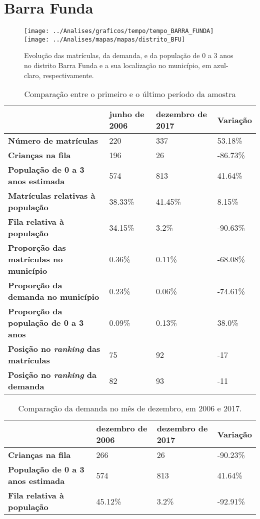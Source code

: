 \section{Barra Funda}
\begin{figure}[H]
\centering
\texttt{[image: ../Analises/graficos/tempo/tempo\_BARRA\_FUNDA]}
\texttt{[image: ../Analises/mapas/mapas/distrito\_BFU]}
\caption{Evolução das matrículas, da demanda, e da população de 0 a 3 anos no distrito Barra Funda e a sua localização no município, em azul-claro, respectivamente.}
\end{figure}
\begin{table}[H]
\begin{tabular}{l|l|l|l}
\textbf{}                                      & \textbf{junho de 2006}       & \textbf{dezembro de 2017}    & \textbf{Variação} \\ \hline
\textbf{Número de matrículas}                  & 220 & 337 & 53.18\% \\ \hline
\textbf{Crianças na fila}                      & 196 & 26 & -86.73\% \\ \hline
\textbf{População de 0 a 3 anos estimada}      & 574 & 813 & 41.64\% \\ \hline
\textbf{Matrículas relativas à população}      & 38.33\% & 41.45\% & 8.15\% \\ \hline
\textbf{Fila relativa à população}             & 34.15\% & 3.2\% & -90.63\% \\ \hline
\textbf{Proporção das matrículas no município} & 0.36\% & 0.11\% & -68.08\% \\ \hline
\textbf{Proporção da demanda no município}     & 0.23\% & 0.06\% & -74.61\% \\ \hline
\textbf{Proporção da população de 0 a 3 anos}  & 0.09\% & 0.13\% & 38.0\% \\ \hline
\textbf{Posição no \textit{ranking} das matrículas}     & 75 & 92 & -17 \\ \hline
\textbf{Posição no \textit{ranking} da demanda}         & 82 & 93 & -11 \\ 
\end{tabular}
\caption{Comparação entre o primeiro e o último período da amostra}
\end{table}
\begin{table}[H]
\begin{tabular}{l|l|l|l}
\textbf{}                                 & \textbf{dezembro de 2006} & \textbf{dezembro de 2017} & \textbf{Variação} \\ \hline
\textbf{Crianças na fila}                      & 266 & 26 & -90.23\% \\ \hline
\textbf{População de 0 a 3 anos estimada}      & 574 & 813 & 41.64\% \\ \hline
\textbf{Fila relativa à população}             & 45.12\% & 3.2\% & -92.91\% \\
\end{tabular}
\caption{Comparação da demanda no mês de dezembro, em 2006 e 2017.}
\end{table}
